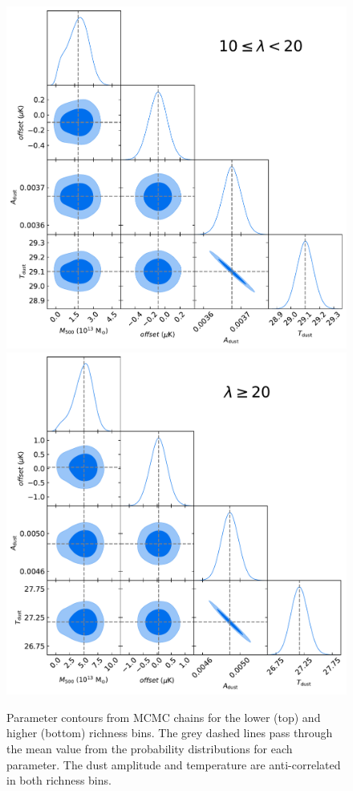 \documentclass[a4paper,fleqn,usenatbib]{mnras}
\begin{document}



\begin{figure}
  \centering
  \includegraphics[width= \columnwidth] {corner_171219_nw_12_ns_10000_mbat_tophat_11_arcmin_ncut_10_20_cut_1000.pdf}
  \includegraphics[width= \columnwidth] {corner_171219_nw_12_ns_10000_mbat_tophat_11_arcmin_ncut_gt20_cut_1000.pdf}
  \caption{Parameter contours from MCMC chains for the lower (top) and higher (bottom) richness bins. The grey dashed lines pass through the mean value from the probability distributions for each parameter. The dust amplitude and temperature are anti-correlated in both richness bins.}  \label{fig:mcmccontours}
\end{figure}
\end{document}
